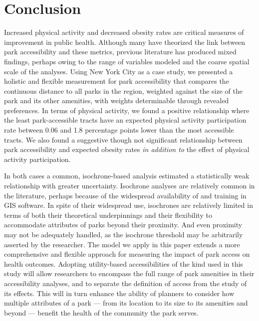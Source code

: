 \documentclass[shortAfour,sageh.bst]{sagej}
\begin{document}
\hypertarget{conclusion}{%
\section{Conclusion}\label{conclusion}}

Increased physical activity and decreased obesity rates are critical
measures of improvement in public health. Although many have theorized
the link between park accessibility and these metrics, previous
literature has produced mixed findings, perhaps owing to the range of
variables modeled and the coarse spatial scale of the analyses. Using
New York City as a case study, we presented a holistic and flexible
measurement for park accessibility that compares the continuous distance
to all parks in the region, weighted against the size of the park and
its other amenities, with weights determinable through revealed
preferences. In terms of physical activity, we found a positive
relationship where the least park-accessible tracts have an expected
physical activity participation rate between 0.06 and 1.8 percentage
points lower than the most accessible tracts. We also found a suggestive
though not significant relationship between park accessibility and
expected obesity rates \emph{in addition to} the effect of physical
activity participation.

In both cases a common, isochrone-based analysis estimated a
statistically weak relationship with greater uncertainty. Isochrone
analyses are relatively common in the literature, perhaps because of the
widespread availability of and training in GIS software. In spite of
their widespread use, isochrones are relatively limited in terms of both
their theoretical underpinnings and their flexibility to accommodate
attributes of parks beyond their proximity. And even proximity may not
be adequately handled, as the isochrone threshold may be arbitrarily
asserted by the researcher. The model we apply in this paper extends a
more comprehensive and flexible approach for measuring the impact of
park access on health outcomes. Adopting utility-based accessibilities
of the kind used in this study will allow researchers to encompass the
full range of park amenities in their accessibility analyses, and to
separate the definition of access from the study of its effects. This
will in turn enhance the ability of planners to consider how multiple
attributes of a park --- from its location to its size to its amenities
and beyond --- benefit the health of the community the park serves.

\begin{acks}
\end{acks}
\end{document}
